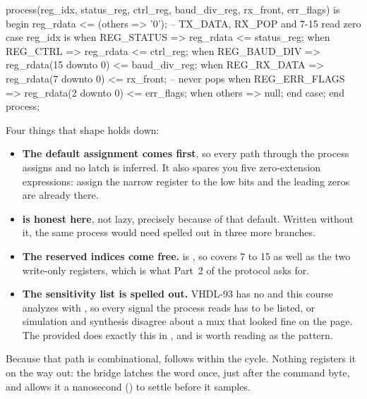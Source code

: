 \begin{vhdlcode}
process(reg_idx, status_reg, ctrl_reg, baud_div_reg, rx_front, err_flags) is
begin
    reg_rdata <= (others => '0');            -- TX_DATA, RX_POP and 7-15 read zero
    case reg_idx is
        when REG_STATUS    => reg_rdata              <= status_reg;
        when REG_CTRL      => reg_rdata              <= ctrl_reg;
        when REG_BAUD_DIV  => reg_rdata(15 downto 0) <= baud_div_reg;
        when REG_RX_DATA   => reg_rdata(7 downto 0)  <= rx_front;  -- never pops
        when REG_ERR_FLAGS => reg_rdata(2 downto 0)  <= err_flags;
        when others        => null;
    end case;
end process;
\end{vhdlcode}

\noindent Four things that shape holds down:
\begin{itemize}
  \item \textbf{The default assignment comes first}, so every path through the process assigns
     and no latch is inferred. It also spares you five zero-extension expressions:
    assign the narrow register to the low bits and the leading zeros are already there.
  \item \textbf{ is honest here}, not lazy, precisely because of that
    default. Written without it, the same process would need  spelled out in
    three more branches.
  \item \textbf{The reserved indices come free.}  is , so
     covers 7 to 15 as well as the two write-only registers, which is what Part~2
    of the protocol asks for.
  \item \textbf{The sensitivity list is spelled out.} VHDL-93 has no  and this
    course analyzes with , so every signal the process reads has to be listed, or
    simulation and synthesis disagree about a mux that looked fine on the page. The provided
     does exactly this in , and is worth reading as
    the pattern.
\end{itemize}

Because that path is combinational,  follows  within the cycle.
Nothing registers it on the way out: the bridge latches the word once, just after the command byte,
and  allows it a nanosecond () to settle before it samples.

